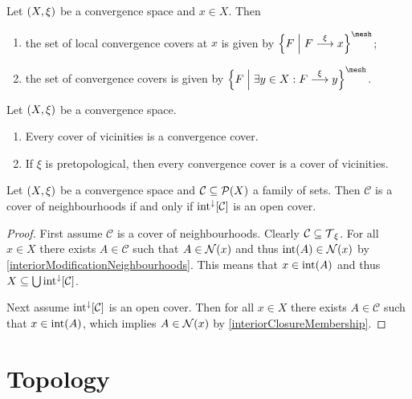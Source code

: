 \begin{lemma}
Let $\left( X,\xi \right)$ be a convergence space and $x\in X$. Then
\begin{enumerate}
\item the set of local convergence covers at $x$ is given by $\setbuilder{F}{F\overset{\xi}{\longrightarrow} x}^\mesh$;
\item the set of convergence covers is given by $\setbuilder{F}{\exists y\in X: F\overset{\xi}{\longrightarrow} y}^\mesh$.
\end{enumerate}
\end{lemma}

\begin{lemma}
Let $\left( X,\xi \right)$ be a convergence space.
\begin{enumerate}
\item Every cover of vicinities is a convergence cover.
\item If $\xi$ is pretopological, then every convergence cover is a cover of vicinities.
\end{enumerate}
\end{lemma}

\begin{lemma}
Let $\left( X,\xi \right)$ be a convergence space and $\mathcal{C}\subseteq \operatorname{\mathcal{P}}(X)$ a family of sets. Then $\mathcal{C}$ is a cover of neighbourhoods \textup{if and only if} $\operatorname{int}^\downarrow[\mathcal{C}]$ is an open cover.
\end{lemma}
\begin{proof}
First assume $\mathcal{C}$ is a cover of neighbourhoods. Clearly $\mathcal{C} \subseteq \operatorname{\mathcal{T}}_\xi$. For all $x\in X$ there exists $A\in \mathcal{C}$ such that $A\in \operatorname{\mathcal{N}}(x)$ and thus $\operatorname{int}(A) \in \operatorname{\mathcal{N}}(x)$ by \ref{interiorModificationNeighbourhoods}. This means that $x\in \operatorname{int}(A)$ and thus $X\subseteq \bigcup\operatorname{int}^\downarrow[\mathcal{C}]$.

Next assume $\operatorname{int}^\downarrow[\mathcal{C}]$ is an open cover. Then for all $x\in X$ there exists $A\in \mathcal{C}$ such that $x\in \operatorname{int}(A)$, which implies $A\in \operatorname{\mathcal{N}}(x)$ by \ref{interiorClosureMembership}.
\end{proof}




\section{Topology}
